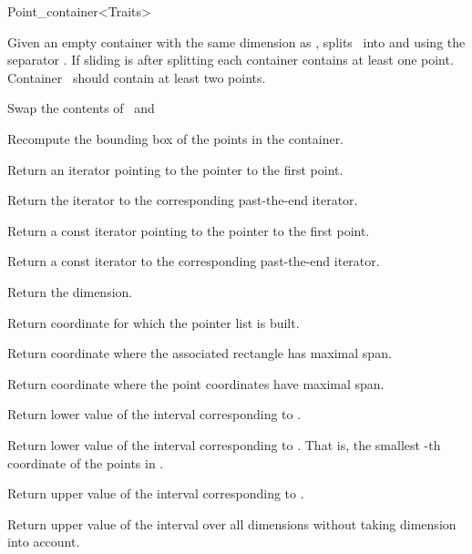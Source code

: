 \begin{ccRefClass}{Point_container<Traits>}
\begin{ccAdvanced}
{Given an empty container  with the same dimension as \ccVar, splits \ccVar\ into
\ccVar and  using the separator . If sliding is  after splitting 
each container contains at least one point. Container \ccVar\ should contain at least two points.}


{Swap the contents of \ccVar\ and }


{Recompute the bounding box of the points in the container.}


{
Return an iterator pointing to the pointer to the first point.
}

{
Return the iterator to the corresponding past-the-end iterator.
}

{
Return a const iterator pointing to the pointer to the first point.
}

{
Return a const iterator to the corresponding past-the-end iterator.
}

{
Return the dimension.
}

{
Return coordinate for which the pointer list is built.
}

{
Return coordinate where the associated rectangle has maximal span.
}

{
Return coordinate where the point coordinates have maximal span.
}

{
Return lower value of the interval corresponding to
.
}


{
Return lower value of the interval corresponding to
. That is, the smallest
-th coordinate of the points in
\ccVar.
}


{
Return upper value of the interval corresponding to
.
}

{
Return upper value of the interval over all dimensions
without taking dimension  into account.
}


\end{ccAdvanced}
\end{ccRefClass}
